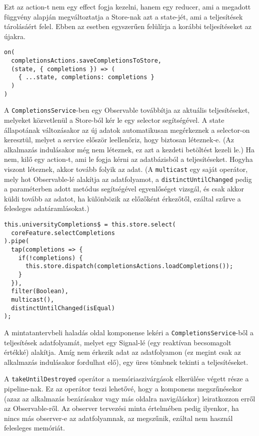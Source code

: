 \documentclass[a4paper,12pt]{report}
\begin{document}
Ezt az action-t nem egy effect fogja kezelni, hanem egy reducer, ami a megadott függvény alapján megváltoztatja a Store-nak azt a state-jét, ami a teljesítések tárolásáért felel. Ebben az esetben egyszerűen felülírja a korábbi teljesítéseket az újakra.

\pagebreak
\begin{samepage}
    \begin{verbatim}
on(
  completionsActions.saveCompletionsToStore,
  (state, { completions }) => (
    { ...state, completions: completions }
  )
)
    \end{verbatim}
\end{samepage}

A \verb|CompletionsService|-ben egy Observable továbbítja az aktuális teljesítéseket, melyeket közvetlenül a Store-ból kér le egy selector segítségével. A state állapotának változásakor az új adatok automatikusan megérkeznek a selector-on keresztül, melyet a service először leellenőriz, hogy biztosan léteznek-e. (Az alkalmazás indulásakor még nem léteznek, ez azt a kezdeti betöltést kezeli le.) Ha nem, kilő egy action-t, ami le fogja kérni az adatbázisból a teljesítéseket. Hogyha viszont léteznek, akkor tovább folyik az adat. (A \verb|multicast| egy saját operátor, mely hot Observable-lé alakítja az adatfolyamot, a \verb|distinctUntilChanged| pedig a paraméterben adott metódus segítségével egyenlőséget vizsgál, és csak akkor küldi tovább az adatot, ha különbözik az előzőként érkezőtől, ezáltal szűrve a felesleges adatáramlásokat.)

\begin{samepage}
    \begin{verbatim}
this.universityCompletions$ = this.store.select(
  coreFeature.selectCompletions
).pipe(
  tap(completions => {
    if(!completions) {
      this.store.dispatch(completionsActions.loadCompletions());
    }
  }),
  filter(Boolean),
  multicast(),
  distinctUntilChanged(isEqual)
);
    \end{verbatim}
\end{samepage}

A mintatantervbeli haladás oldal komponense lekéri a \verb|CompletionsService|-ből a teljesítések adatfolyamát, melyet egy Signal-lé (egy reaktívan becsomagolt értékké) alakítja. Amíg nem érkezik adat az adatfolyamon (ez megint csak az alkalmazás indulásakor fordulhat elő), egy üres tömbnek tekinti a teljesítéseket.

A \verb|takeUntilDestroyed| operátor a memóriaszivárgások elkerülése végett része a pipeline-nak. Ez az operátor teszi lehetővé, hogy a komponens megszűnésekor (azaz az alkalmazás bezárásakor vagy más oldalra navigáláskor) leiratkozzon erről az Observable-ről. Az observer tervezési minta értelmében pedig ilyenkor, ha nincs más observer-e az adatfolyamnak, az megszűnik, ezáltal nem használ felesleges memóriát.
\end{document}
